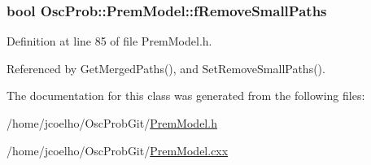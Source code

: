 \subsubsection[{\texorpdfstring{f\+Remove\+Small\+Paths}{fRemoveSmallPaths}}]{\setlength{\rightskip}{0pt plus 5cm}bool Osc\+Prob\+::\+Prem\+Model\+::f\+Remove\+Small\+Paths\hspace{0.3cm}{\ttfamily [protected]}}\hypertarget{classOscProb_1_1PremModel_a3973df6f5f2ff219cd2f865b31aacfd2}{}\label{classOscProb_1_1PremModel_a3973df6f5f2ff219cd2f865b31aacfd2}


Definition at line 85 of file Prem\+Model.\+h.



Referenced by Get\+Merged\+Paths(), and Set\+Remove\+Small\+Paths().



The documentation for this class was generated from the following files\+:\begin{DoxyCompactItemize}
\item 
/home/jcoelho/\+Osc\+Prob\+Git/\hyperlink{PremModel_8h}{Prem\+Model.\+h}\item 
/home/jcoelho/\+Osc\+Prob\+Git/\hyperlink{PremModel_8cxx}{Prem\+Model.\+cxx}\end{DoxyCompactItemize}
